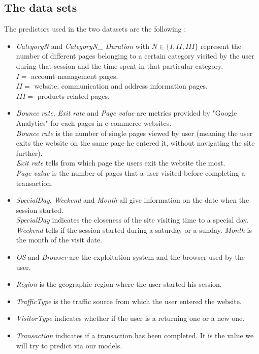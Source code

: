 \documentclass[11pt]{article}
\begin{document}
\subsection*{The data sets}
The predictors used in the two datasets are the following :
\begin{itemize}
\item \emph{CategoryN} and \emph{CategoryN\_ Duration} with $N\in \{ I, II, III\} $ represent the number of different pages belonging to a certain category visited by the user during that session and the time spent in that particular category.\\
$I=$ account management pages.\\
$II=$ website, communication and address information pages.\\
$III=$ products related pages. 
\item \emph{Bounce rate}, \emph{Exit rate} and \emph{Page value} are metrics provided by "Google Analytics" for each pages in e-commerce websites.\\
\emph{Bounce rate} is the number of single pages viewed by user (meaning the user exits the website on the same page he entered it, without navigating the site further).\\
\emph{Exit rate} tells from which page the users exit the website the most.\\
\emph{Page value} is the number of pages that a user visited before completing a transaction.
\item \emph{SpecialDay}, \emph{Weekend} and \emph{Month} all give information on the date when the session started.\\
\emph{SpecialDay} indicates the closeness of the site visiting time to a special day.\\
\emph{Weekend} tells if the session started during a saturday or a sunday.
\emph{Month} is the month of the visit date.
\item \emph{OS} and \emph{Browser} are the exploitation system and the browser used by the user.
\item \emph{Region} is the geographic region where the user started his session.
\item \emph{TrafficType} is the traffic source from which the user entered the website.
\item \emph{VisitorType} indicates whether if the user is a returning one or a new one.
\item \emph{Transaction} indicates if a transaction has been completed. It is the value we will try to predict via our models.
\end{itemize} 
\end{document}
